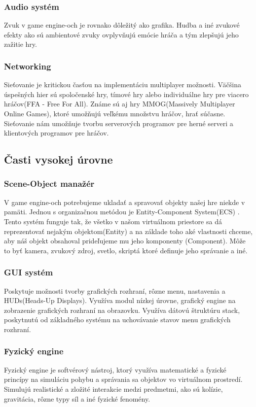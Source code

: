 \documentclass[10pt,oneside,slovak,a4paper,hidelinks]{article}
\begin{document}
		\subsubsection{Audio systém}
			Zvuk v game engine-och je rovnako dôležitý ako grafika. Hudba a iné zvukové efekty ako sú ambientové zvuky ovplyvňujú emócie hráča a tým zlepšujú jeho zažitie hry.
		\subsubsection{Networking}
			Sieťovanie je kritickou časťou na implementáciu multiplayer možnosti. Väčšina úspešných hier sú spoločenské hry, tímové hry alebo individuálne hry pre viacero hráčov(FFA - Free For All). Známe sú aj hry MMOG(Massively Multiplayer Online Games), ktoré umožňujú veľkému množstvu hráčov, hrať súčasne. Sieťovanie nám umožňuje tvorbu serverových programov pre herné serveri a klientových programov pre hráčov.
	\subsection{Časti vysokej úrovne}
		\subsubsection{Scene-Object manažér}
			V game engine-och potrebujeme ukladať a spravovať objekty našej hre niekde v pamäti. Jednou s organizačnou metódou je Entity-Component System(ECS) \cite{ECS}. Tento systém funguje tak, že všetko v našom virtuálnom priestore sa dá reprezentovať nejakým objektom(Entity) a na základe toho aké vlastnosti chceme, aby náš objekt obsahoval prideľujeme mu jeho komponenty (Component). Môže to byť kamera, zvukový zdroj, svetlo, skriptá ktoré definuje jeho správanie a iné.
		\subsubsection{GUI systém}
			Poskytuje možnosti tvorby grafických rozhraní, rôzne menu, nastavenia a HUDs(Heads-Up Displays). Využíva modul nízkej úrovne, grafický engine na zobrazenie grafických rozhraní na obrazovku. Využíva dátovú štruktúru stack, poskytnutú od základného systému na uchovávanie stavov menu grafických rozhraní.
		\subsubsection{Fyzický engine}
			Fyzický engine je softvérový nástroj, ktorý využíva matematické a fyzické princípy na simuláciu pohybu a správania sa objektov vo virtuálnom prostredí. Simulujú realistické a zložité interakcie medzi predmetmi, ako sú kolízie, gravitácia, rôzne typy síl a iné fyzické fenomény.
\end{document}
